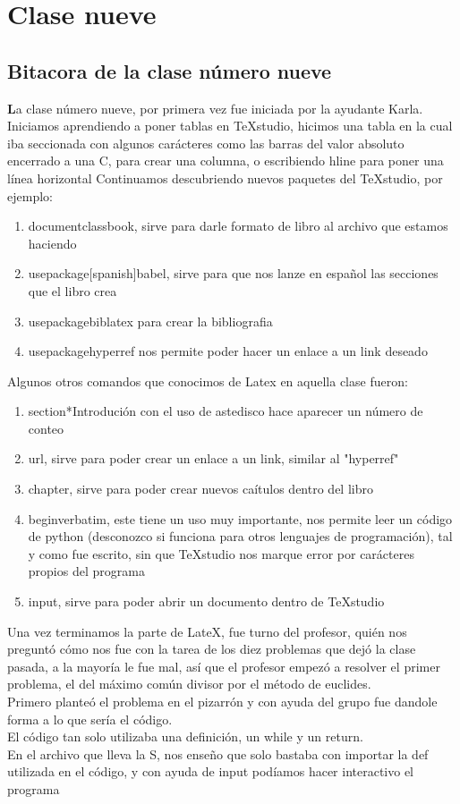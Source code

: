 \documentclass{book}
\begin{document}
\chapter{Clase nueve}
\section{Bitacora de la clase número nueve}
\textbf La clase número nueve, por primera vez fue iniciada por la ayudante Karla. Iniciamos aprendiendo a poner tablas en TeXstudio, hicimos una tabla en la cual iba seccionada con algunos carácteres como las barras del valor absoluto encerrado a una C, para crear una columna, o escribiendo hline para poner una línea horizontal
Continuamos descubriendo nuevos paquetes del TeXstudio, por ejemplo:
\begin{enumerate}
	\item documentclass{book}, sirve para darle formato de libro al archivo que estamos haciendo
	\item usepackage[spanish]{babel}, sirve para que nos lanze en español las secciones que el libro crea
	\item usepackage{biblatex} para crear la bibliografia
	\item usepackage{hyperref} nos permite poder hacer un enlace a un link deseado
\end{enumerate}
Algunos otros comandos que conocimos de Latex en aquella clase fueron: 
\begin{enumerate}
	\item section*{Introdución} con el uso de astedisco hace aparecer un número de conteo
	\item url, sirve para poder crear un enlace a un link, similar al "hyperref"
	\item chapter, sirve para poder crear nuevos caítulos dentro del libro
	\item begin{verbatim}, este tiene un uso muy importante, nos permite leer un código de python (desconozco si funciona para otros lenguajes de programación), tal y como fue escrito, sin que TeXstudio nos marque error por carácteres propios del programa
	\item input, sirve para poder abrir un documento dentro de TeXstudio
\end{enumerate}
Una vez terminamos la parte de LateX, fue turno del profesor, quién nos preguntó cómo nos fue con la tarea de los diez problemas que dejó la clase pasada, a la mayoría le fue mal, así que el profesor empezó a resolver el primer problema, el del máximo común divisor por el método de euclides.\\
Primero planteó el problema en el pizarrón y con ayuda del grupo fue dandole forma a lo que sería el código. \\
El código tan solo utilizaba una definición, un while y un return.\\
En el archivo que lleva la S, nos enseño que solo bastaba con importar la def utilizada en el código, y con ayuda de input podíamos hacer interactivo el programa\\
\end{document}

